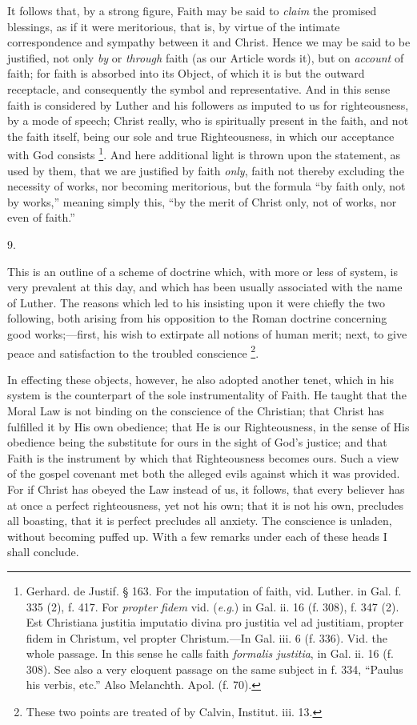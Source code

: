 It follows that, by a strong figure, Faith may be said to \emph{claim}
the promised blessings, as if it were meritorious, that is, by virtue
of the intimate correspondence and sympathy between it and Christ.
Hence we may be said to be justified, not only \emph{by} or \emph{through}
faith (as our Article words it), but on \emph{account} of faith; for faith is
absorbed into its Object, of which it is but the outward
receptacle, and consequently the symbol and representative. And in
this sense faith is considered by Luther and his followers as imputed
to us for righteousness, by a mode of speech; Christ really, who is
spiritually present in the faith, and not the faith itself, being our
sole and true Righteousness, in which our acceptance with God consists
\footnote{Gerhard. de
Justif. § 163. For the imputation of faith, vid. Luther. in Gal. f.
335 (2), f. 417. For \emph{propter fidem} vid. (\emph{e.g}.) in Gal.
ii. 16 (f. 308), f. 347 (2). Est Christiana justitia imputatio divina
pro justitia vel ad justitiam, propter fidem in Christum, vel propter
Christum.—In Gal. iii. 6 (f. 336). Vid. the whole passage. In this
sense he calls faith \emph{formalis justitia}, in Gal. ii. 16 (f.
308). See also a very eloquent passage on the same subject in f. 334,
``Paulus his verbis, etc.'' Also Melanchth. Apol. (f. 70).}. And here additional light is thrown upon the statement, as
used by them, that we are justified by faith \emph{only}, faith not
thereby excluding the necessity of works, nor becoming meritorious,
but the formula ``by faith only, not by works,'' meaning
simply this, ``by the merit of Christ only, not of works, nor even
of faith.''

9.

This is an outline of a scheme of doctrine which, with more or less
of system, is very prevalent at this day, and which has been usually
associated with the name of Luther. The reasons which led to his
insisting upon it were chiefly the two following, both arising from
his opposition to the Roman doctrine concerning good works;—first,
his wish to extirpate all notions of human merit; next, to give peace
and satisfaction to the troubled conscience \footnote{These two
points are treated of by Calvin, Institut. iii. 13.}.

In effecting these objects, however, he also adopted another tenet,
which in his system is the counterpart of the sole instrumentality of
Faith. He taught that the Moral Law is not binding on the conscience
of the Christian; that Christ has fulfilled it by His own obedience;
that He is our Righteousness, in the sense of His obedience being the
substitute for ours in the sight of God's justice; and that Faith is
the instrument by which that Righteousness becomes ours. Such a view
of the gospel covenant met both the alleged evils against which it was
provided. For if Christ has obeyed the Law instead of us, it follows,
that every believer has at once a perfect righteousness, yet not his
own; that it is not his own, precludes all boasting, that it is
perfect precludes all anxiety. The conscience is unladen, without
becoming puffed up. With a few remarks under each of these heads I
shall conclude.

